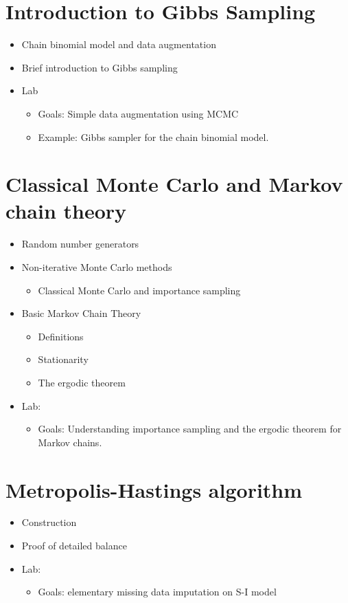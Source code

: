 \documentclass[11pt]{article}
\begin{document}
\section{Introduction to Gibbs Sampling}
\begin{itemize}
\item Chain binomial model and data augmentation
\item Brief introduction to Gibbs sampling
\item Lab
\begin{itemize}
\item Goals: Simple data augmentation using MCMC
\item Example: Gibbs sampler for the chain binomial model.
\end{itemize}
\end{itemize}


\section{Classical Monte Carlo and Markov chain theory}
 \begin{itemize}
 \item Random number generators 
\item {Non-iterative Monte Carlo methods}
\begin{itemize}
\item Classical Monte Carlo and importance sampling%
\end{itemize}
\item{Basic Markov Chain Theory} 
\begin{itemize}
\item Definitions
\item Stationarity
\item The ergodic theorem
\end{itemize}
\item Lab: 
\begin{itemize}
\item Goals: Understanding importance sampling and the ergodic theorem for Markov chains.
\end{itemize} 
\end{itemize}


\section{Metropolis-Hastings algorithm}
\begin{itemize}
\item Construction
\item Proof of detailed balance
\item Lab: 
\begin{itemize}
\item Goals: elementary missing data imputation on S-I model
\end{itemize}
\end{itemize}
\end{document}
